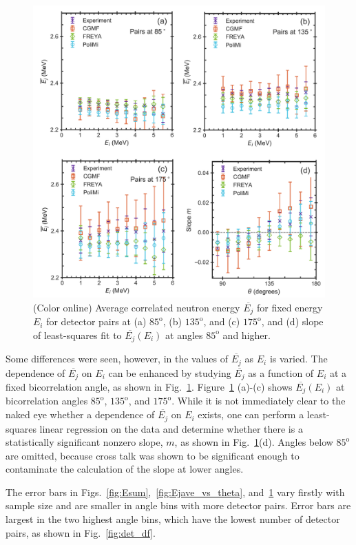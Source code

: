 \documentclass[preprint,12pt]{elsarticle}
\newcommand{\fig}[1]     {Fig.~\ref{#1}}
\newcommand{\figfirst}[1]  {Figure~\ref{#1}}
\newcommand{\coloronline}     {(Color online)\xspace}
\newcommand{\Ei}{\ensuremath{E_i}\xspace}
\newcommand{\Ejave}{\ensuremath{\overline{E_j}}\xspace}
\newcommand{\degrees}[1]{\ensuremath{#1^{\mathrm{o}}}\xspace}
\begin{document}
\begin{figure}[!t]
	\centering
	\includegraphics[trim={0cm 0cm 0cm 0cm},clip,width=7in]{E_slope.png}
	\caption{\coloronline Average correlated neutron energy \Ejave for fixed energy \Ei for detector pairs at (a) \degrees{85}, (b) \degrees{135}, and (c) \degrees{175}, and (d) slope of least-squares fit to $\Ejave(\Ei)$ at angles \degrees{85} and higher.} 
	\label{fig:Ejave_vs_Ei}
\end{figure}

Some differences were seen, however, in the values of \Ejave as \Ei is varied. The dependence of \Ejave on \Ei can be enhanced by studying \Ejave as a function of \Ei at a fixed bicorrelation angle, as shown in \fig{fig:Ejave_vs_Ei}. 
\figfirst{fig:Ejave_vs_Ei} (a)-(c) shows $\Ejave(\Ei)$ at bicorrelation angles \degrees{85}, \degrees{135}, and \degrees{175}. While it is not immediately clear to the naked eye whether a dependence of \Ejave on \Ei exists, one can perform a least-squares linear regression on the data and determine whether there is a statistically significant nonzero slope, $m$, as shown in \fig{fig:Ejave_vs_Ei}(d). Angles below \degrees{85} are omitted, because cross talk was shown to be significant enough to contaminate the calculation of the slope at lower angles.

The error bars in Figs.~\ref{fig:Esum},~\ref{fig:Ejave_vs_theta}, and~\ref{fig:Ejave_vs_Ei} vary firstly with sample size and are smaller in angle bins with more detector pairs. Error bars are largest in the two highest angle bins, which have the lowest number of detector pairs, as shown in \fig{fig:det_df}.
\end{document}
